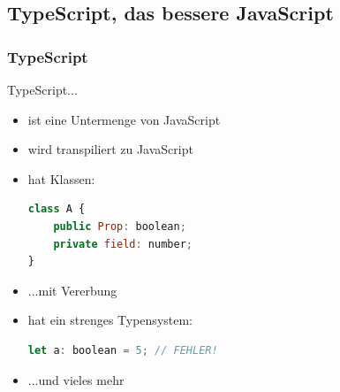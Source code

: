 \documentclass[12pt, draft]{beamer}
\begin{document}
\subsection{TypeScript, das bessere JavaScript}
\begin{frame}[fragile]
	\frametitle{TypeScript}
	TypeScript...
	\begin{itemize}
		\item ist eine Untermenge von JavaScript
		\item wird transpiliert zu JavaScript
		\item hat Klassen:\\
		\begin{lstlisting}[language=JavaScript]
class A {
	public Prop: boolean;
	private field: number;
}
		\end{lstlisting}
		\item ...mit Vererbung
		\item hat ein strenges Typensystem:\\
		\begin{lstlisting}[language=JavaScript]
let a: boolean = 5; // FEHLER!
		\end{lstlisting}
		\item ...und vieles mehr
	\end{itemize}
\end{frame}
\end{document}
